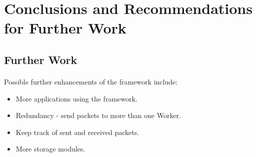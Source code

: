 \section{Conclusions and Recommendations for Further Work}
\paragraph{}



\subsection{Further Work}
\paragraph{}
Possible further enhancements of the framework include:
\begin{itemize}
\item More applications using the framework.
\item Redundancy - send packets to more than one Worker.
\item Keep track of sent and received packets.
\item More storage modules.
\end{itemize}
